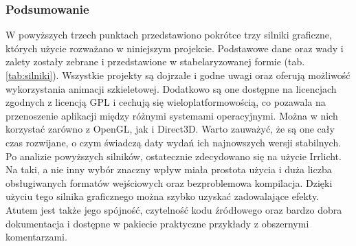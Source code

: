 \documentclass[11pt]{mwrep}
\begin{document}
      \subsubsection{Podsumowanie}
      W powyższych trzech punktach przedstawiono pokrótce trzy silniki graficzne, których użycie rozważano w niniejszym projekcie. Podstawowe dane oraz wady i zalety zostały zebrane i przedstawione w stabelaryzowanej formie (tab. \ref{tab:silniki}). Wszystkie projekty są dojrzałe i godne uwagi oraz oferują możliwość wykorzystania animacji szkieletowej. Dodatkowo są one dostępne na licencjach zgodnych z licencją GPL i cechują się wieloplatformowością, co pozawala na przenoszenie aplikacji między różnymi systemami operacyjnymi. Można w nich korzystać zarówno z OpenGL, jak i Direct3D. Warto zauważyć, że są one cały czas rozwijane, o czym świadczą daty wydań ich najnowszych wersji stabilnych. Po analizie powyższych silników, ostatecznie zdecydowano się na użycie Irrlicht. Na taki, a nie inny wybór znaczny wpływ miała prostota użycia i duża liczba obsługiwanych formatów wejściowych oraz bezproblemowa kompilacja. Dzięki użyciu tego silnika graficznego można szybko uzyskać zadowalające efekty. Atutem jest także jego spójność, czytelność kodu źródłowego oraz bardzo dobra dokumentacja i dostępne w pakiecie praktyczne przykłady z obszernymi komentarzami.
\end{document}
